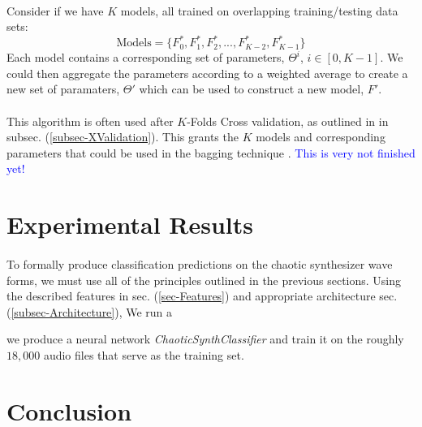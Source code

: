 \documentclass[12pt,letterpaper]{article}
\begin{document}
\paragraph*{}Consider if we have $K$ models, all trained on overlapping training/testing data sets:
\begin{equation}
\text{Models} = \Big\{ F^*_{0} , F^*_{1} , F^*_{2} , ... , F^*_{K-2} , F^*_{K-1} \Big\}
\end{equation}
Each model contains a corresponding set of parameters, $\Theta^{i}$, $i \in [0,K-1]$.
We could then aggregate the parameters according to a weighted average to create a new set of paramaters, $\Theta '$ which can be used to construct a new model, $F'$.

\paragraph*{}This algorithm is often used after $K$-Folds Cross validation, as outlined in in subsec. (\ref{subsec-XValidation}). This grants the $K$ models and corresponding parameters that could be used in the bagging technique \cite{James}. \textcolor{blue}{This is very not finished yet!}


\newpage
\section{Experimental Results}
\label{sec-Results}

\paragraph*{}To formally produce classification predictions on the chaotic synthesizer wave forms, we must use all of the principles outlined in the previous sections. Using the described features in sec. (\ref{sec-Features}) and appropriate architecture sec. (\ref{subsec-Architecture}), We run a 



we produce a neural network \textit{ChaoticSynthClassifier} and train it on the roughly $18,000$ audio files that serve as the training set.



\newpage
\section{Conclusion}
\label{sec-Conclusion}
\end{document}
